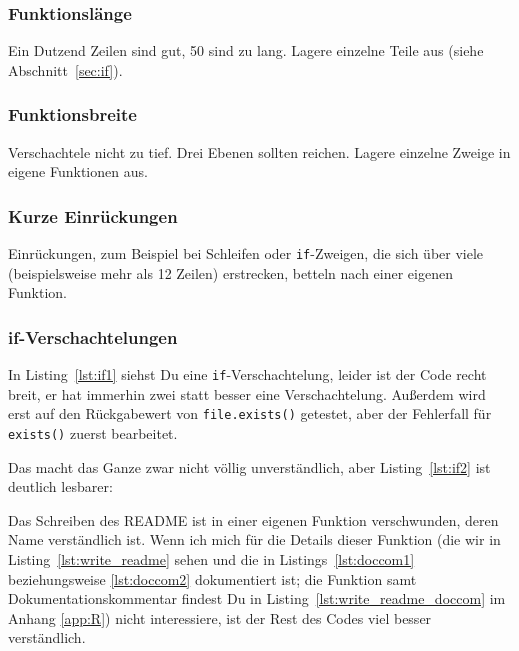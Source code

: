 \documentclass[twoside]{scrartcl}
\providecommand{\code}[1]{\texttt{#1}}
\begin{document}
\subsubsection{Funktionsl\"a{}nge} 
Ein Dutzend Zeilen sind gut, 50 sind zu lang.
Lagere einzelne Teile aus (siehe Abschnitt~\ref{sec:if}).

\subsubsection{Funktionsbreite\label{sec:breite}} 
Verschachtele nicht zu tief. Drei Ebenen sollten reichen. 
Lagere einzelne Zweige in eigene Funktionen aus.

\subsubsection{Kurze Einr\"u{}ckungen} 
Einr\"u{}ckungen, zum Beispiel bei Schleifen oder \code{if}-Zweigen,
die sich \"u{}ber viele (beispielsweise mehr als 12 Zeilen) erstrecken, betteln
nach einer eigenen Funktion.

\subsubsection{if-Verschachtelungen\label{sec:if}}
In Listing~\ref{lst:if1} siehst Du eine \code{if}-Verschachtelung, leider ist
der Code recht breit, er hat immerhin zwei statt besser eine Verschachtelung.
Au\ss{}erdem wird erst auf den R\"u{}ckgabewert von
\code{file.exists()} getestet, aber der Fehlerfall f\"u{}r
\code{exists()} zuerst bearbeitet.



Das macht das Ganze zwar nicht v\"o{}llig unverst\"a{}ndlich, aber
Listing~\ref{lst:if2} ist deutlich lesbarer:



Das Schreiben des README ist in
einer eigenen Funktion verschwunden, deren Name verst\"a{}ndlich ist. Wenn ich
mich f\"u{}r die Details dieser Funktion 
(die wir in Listing~\ref{lst:write_readme} sehen und die in
Listings~\ref{lst:doccom1} beziehungsweise \ref{lst:doccom2} dokumentiert ist;
die Funktion samt Dokumentationskommentar findest Du in 
Listing~\ref{lst:write_readme_doccom} 
im Anhang \ref{app:R})
nicht interessiere, ist der Rest des Codes viel besser verst\"a{}ndlich.


\end{document}
